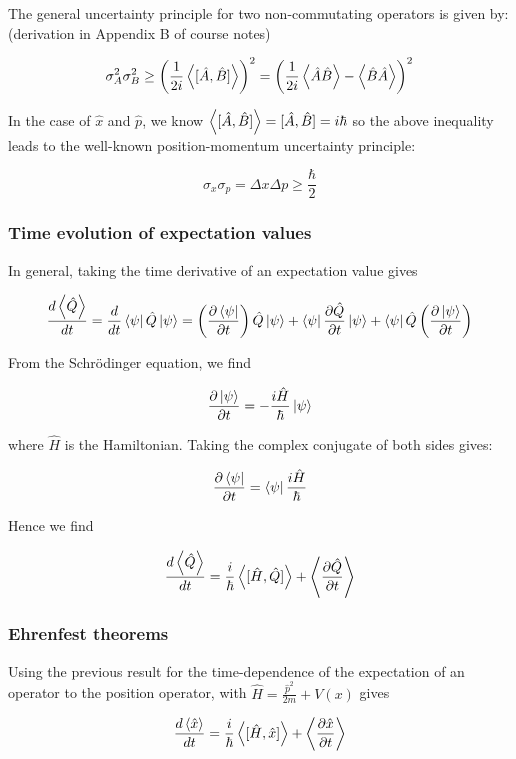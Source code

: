 The general uncertainty principle for two non-commutating operators is given by: (derivation in Appendix B of course notes)

\[ \sigma_{A}^2 \sigma_{B}^2 \geq \left(\frac{1}{2i} \expval{[\hat{A}, \hat{B}]} \right)^2 = \left(\frac{1}{2i} \expval{\hat{A}\hat{B}} - \expval{\hat{B}\hat{A}} \right)^2\]

In the case of $\hat{x}$ and $\hat{p}$, we know $\expval{[\hat{A}, \hat{B}]} = [\hat{A}, \hat{B}] = i\hbar$ so the above inequality leads to the well-known position-momentum uncertainty principle:

\[ \sigma_x \sigma_p = \Delta x \Delta p \geq \frac{\hbar}{2} \]

\subsubsection{Time evolution of expectation values}

In general, taking the time derivative of an expectation value gives 

\[ \frac{d\expval{\hat{Q}}}{dt} = \frac{d}{dt}\bra{\psi}\hat{Q}\ket{\psi} = \left(\frac{\partial\bra{\psi}}{\partial t}\right) \hat{Q}\ket{\psi} + \bra{\psi}\frac{\partial \hat{Q}}{\partial t}\ket{\psi} + \bra{\psi}\hat{Q}\left(\frac{\partial \ket{\psi}}{\partial t}\right) \]

From the Schr\"odinger equation, we find

\[ \frac{\partial\ket{\psi}}{\partial t} = -\frac{i\hat{H}}{\hbar}\ket{\psi} \]

where $\hat{H}$ is the Hamiltonian. Taking the complex conjugate of both sides gives:

\[ \frac{\partial \bra{\psi}}{\partial t} = \bra{\psi}\frac{i\hat{H}}{\hbar} \]

Hence we find 

\[ \frac{d \expval{\hat{Q}}}{d t} = \frac{i}{\hbar}\expval{[\hat{H}, \hat{Q}]} + \expval{\frac{\partial \hat{Q}}{\partial t}} \]

\subsubsection{Ehrenfest theorems}

Using the previous result for the time-dependence of the expectation of an operator to the position operator, with $\hat{H} = \frac{\hat{p}^2}{2m} + V(x)$ gives

\[ \frac{d\expval{\hat{x}}}{dt} = \frac{i}{\hbar}\expval{[\hat{H}, \hat{x}]} + \expval{\frac{\partial \hat{x}}{\partial t}} \]

